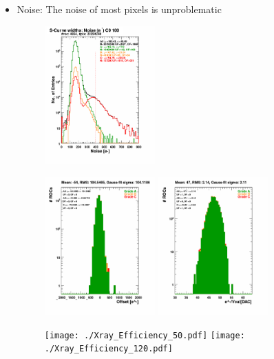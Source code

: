 \documentclass[a4paper,12pt,twoside]{article}
\begin{document}
\begin{itemize}
\item Noise:
The noise of most pixels is unproblematic
\begin{figure} [h!] \centering 
\includegraphics[width=0.4\textwidth, angle=0] {./Xray_NoisePerPixel.pdf}
\end{figure}

\begin{figure} [h!] \centering 
\includegraphics[width=0.4\textwidth, angle=0] {./Xray_VcalOffset.pdf}
\includegraphics[width=0.4\textwidth, angle=0] {./Xray_VcalSlope.pdf}
\end{figure}

\begin{figure} [h!] \centering 
\texttt{[image: ./Xray\_Efficiency\_50.pdf]}
\texttt{[image: ./Xray\_Efficiency\_120.pdf]}
\end{figure}
\end{itemize}
\end{document}
